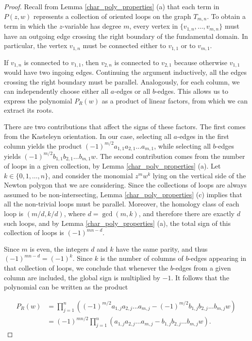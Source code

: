\documentclass[12pt,a4paper]{article}
\theoremstyle{definition}
\def\\deg{\mathrm {\deg}}
\begin{document}
\begin{proof}
    Recall from Lemma \ref{char_poly_properties} (a) that each term in $P(z,w)$ represents a collection of oriented loops on the graph $T_{m,n}$. To obtain a term in which the $z$-variable has degree $m$, every vertex in $\{v_{1,n}, \dots, v_{m,n}\}$ must have an outgoing edge crossing the right boundary of the fundamental domain. In particular, the vertex $v_{1,n}$ must be connected either to $v_{1,1}$ or to $v_{m,1}$.
    
    If $v_{1,n}$ is connected to $v_{1,1}$, then $v_{2,n}$ is connected to $v_{2,1}$ because otherwise $v_{1,1}$ would have two ingoing edges. Continuing the argument inductively, all the edges crossing the right boundary must be parallel. Analogously, for each column, we can independently choose either all $a$-edges or all $b$-edges. This allows us to express the polynomial $P_R(w)$ as a product of linear factors, from which we can extract its roots.
    
    There are two contributions that affect the signs of these factors. The first comes from the Kasteleyn orientation. In our case, selecting all $a$-edges in the first column yields the product $(-1)^{m/2}a_{1,1}a_{2,1}...a_{m,1}$, while selecting all $b$-edges yields $(-1)^{m/2}b_{1,1}b_{2,1}...b_{m,1}w$. The second contribution comes from the number of loops in a given collection, by Lemma \ref{char_poly_properties} (a). Let $k \in \{0, 1, \dots, n\}$, and consider the monomial $z^m w^k$ lying on the vertical side of the Newton polygon that we are considering. Since the collections of loops are always assumed to be non-intersecting, Lemma \ref{char_poly_properties} (c) implies that all the non-trivial loops must be parallel. Moreover, the homology class of each loop is $(m/d, k/d)$, where $d = \gcd(m,k)$, and therefore there are exactly $d$ such loops, and by Lemma \ref{char_poly_properties} (a), the total sign of this collection of loops is $(-1)^{mn-d}$.
    
    Since $m$ is even, the integers $d$ and $k$ have the same parity, and thus $(-1)^{mn-d} = (-1)^k$. Since $k$ is the number of columns of $b$-edges appearing in that collection of loops, we conclude that whenever the $b$-edges from a given column are included, the global sign is multiplied by $-1$. It follows that the polynomial can be written as the product

    \begin{align*}
        P_R(w) &= \prod_{j=1}^n((-1)^{m/2}a_{1,j}a_{2,j}...a_{m,j} - (-1)^{m/2}b_{1,j}b_{2,j}...b_{m,j}w) \\
    &= (-1)^{mn/2} \prod_{j=1}^n(a_{1,j}a_{2,j}...a_{m,j} -b_{1,j}b_{2,j}...b_{m,j}w).
    \end{align*}
    

\end{proof}
\end{document}
